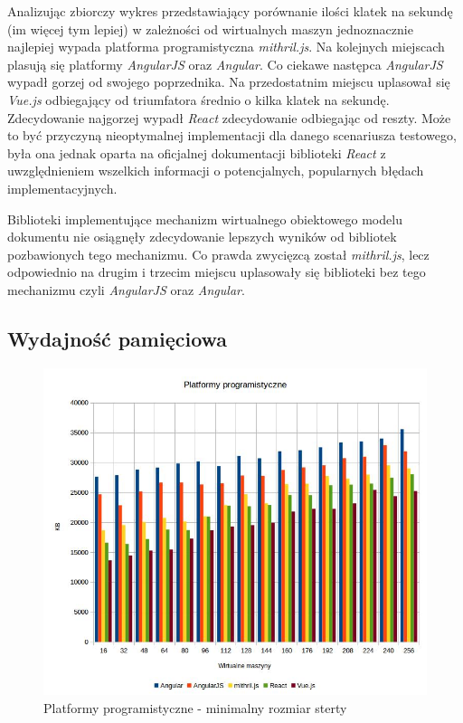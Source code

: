 \documentclass[polish, twoside, 12pt]{mwart}
\begin{document}
Analizując zbiorczy wykres przedstawiający porównanie ilości klatek na sekundę (im więcej tym lepiej) w zależności od wirtualnych maszyn jednoznacznie najlepiej wypada platforma programistyczna \emph{mithril.js}. Na kolejnych miejscach plasują się platformy \emph{AngularJS} oraz \emph{Angular}. Co ciekawe następca \emph{AngularJS} wypadł gorzej od swojego poprzednika. Na przedostatnim miejscu uplasował się \emph{Vue.js} odbiegający od triumfatora średnio o kilka klatek na sekundę. Zdecydowanie najgorzej wypadł \emph{React} zdecydowanie odbiegając od reszty. Może to być przyczyną nieoptymalnej implementacji dla danego scenariusza testowego, była ona jednak oparta na oficjalnej dokumentacji biblioteki \emph{React} z uwzględnieniem wszelkich informacji o potencjalnych, popularnych błędach implementacyjnych. 

Biblioteki implementujące mechanizm wirtualnego obiektowego modelu dokumentu nie osiągnęły zdecydowanie lepszych wyników od bibliotek pozbawionych tego mechanizmu. Co prawda zwycięzcą został \emph{mithril.js}, lecz odpowiednio na drugim i trzecim miejscu uplasowały się biblioteki bez tego mechanizmu czyli \emph{AngularJS} oraz \emph{Angular}.

\subsection{Wydajność pamięciowa}

\begin{figure}[ht]
  \includegraphics[width=\textwidth]{frameworks-heap.jpg}
	\caption{Platformy programistyczne - minimalny rozmiar sterty}
\end{figure}
\end{document}

